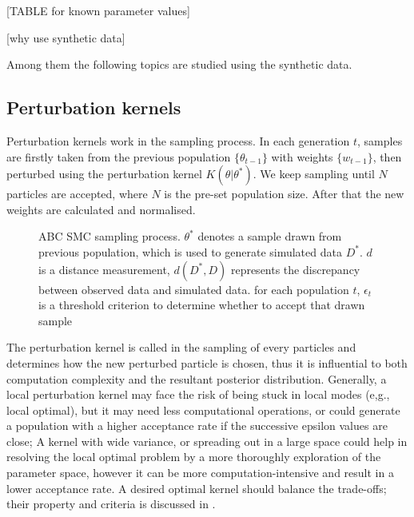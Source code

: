 \documentclass[12pt,a4paper]{report}
\begin{document}
[TABLE for known parameter values]

[why use synthetic data]

Among them the following topics are studied using the synthetic data.

\subsection{Perturbation kernels}

Perturbation kernels work in the sampling process. In each generation $t$, samples are firstly taken from the previous population $\{\theta_{t-1}\}$ with weights $\{w_{t-1}\}$, then perturbed using the perturbation kernel $K(\theta|\theta^*)$. We keep sampling until $N$ particles are accepted, where $N$ is the pre-set population size. After that the new weights are calculated and normalised. 

\begin{figure}[t!]
    \begin{center}
    \end{center}
    
    \caption[ABC SMC sampling process]%
    {ABC SMC sampling process. $\theta^*$ denotes a sample drawn from previous population, which is used to generate simulated data $D^*$. $d$ is a distance measurement, $d(D^*,D)$ represents the discrepancy between observed data and simulated data. for each population $t$, $\epsilon_t$ is a threshold criterion to determine whether to accept that drawn sample} 
    \label{fig:smc}
    
\end{figure}

The perturbation kernel is called in the sampling of every particles and determines how the new perturbed particle is chosen, thus it is influential to both computation complexity and the resultant posterior distribution. Generally, a local perturbation kernel may face the risk of being stuck in local modes (e,g., local optimal), but it may need less computational operations, or could generate a population with a higher acceptance rate if the successive epsilon values are close; A kernel with wide variance, or spreading out in a large space could help in resolving the local optimal problem by a more thoroughly exploration of the parameter space, however it can be more computation-intensive and result in a lower acceptance rate. A desired optimal kernel should balance the trade-offs; their property and criteria is discussed in \cite{ref:kernel}.
\end{document}

